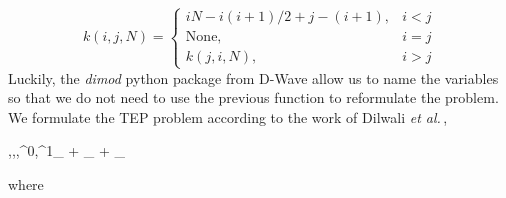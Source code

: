 \begin{equation}
k(i,j,N) = \begin{cases}
    iN - i\left(i+1\right)/2 + j - (i+1), & i<j\\
    \text{None},& i=j \\
    k(j,i,N), & i>j
\end{cases}
    \label{eq: TwoIndexesmap}
\end{equation}
Luckily, the \textit{dimod} python package from D-Wave allow us to name the variables so that we do not need to use the previous function to reformulate the problem. We formulate the TEP problem according to the work of Dilwali \textit{et al.}\,\cite{Dilwali2016},
\begin{mini!}[2]
	{,,,^{0},^{1}}{_{} + _{} + _{}}{\label{eq: objective}}{}{}
\end{mini!}
where
